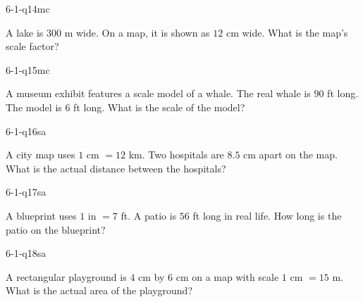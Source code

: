 \begin{practiceQuestion}{6-1-q14}{mc}
\begin{questionText}
A lake is $300$ m wide. On a map, it is shown as $12$ cm wide. What is the map's scale factor?
\end{questionText}
\end{practiceQuestion}

\begin{practiceQuestion}{6-1-q15}{mc}
\begin{questionText}
A museum exhibit features a scale model of a whale. The real whale is $90$ ft long. The model is $6$ ft long. What is the scale of the model?
\end{questionText}
\end{practiceQuestion}


\begin{practiceQuestion}{6-1-q16}{sa}
\begin{questionText}
A city map uses $1$ cm $= 12$ km. Two hospitals are $8.5$ cm apart on the map. What is the actual distance between the hospitals?
\end{questionText}
\end{practiceQuestion}

\begin{practiceQuestion}{6-1-q17}{sa}
\begin{questionText}
A blueprint uses $1$ in $= 7$ ft. A patio is $56$ ft long in real life. How long is the patio on the blueprint?
\end{questionText}
\end{practiceQuestion}

\begin{practiceQuestion}{6-1-q18}{sa}
\begin{questionText}
A rectangular playground is $4$ cm by $6$ cm on a map with scale $1$ cm $= 15$ m. What is the actual area of the playground?
\end{questionText}
\end{practiceQuestion}

